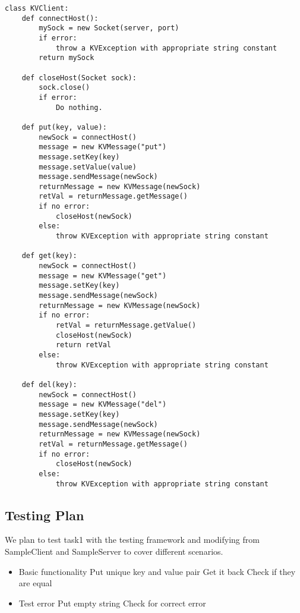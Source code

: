 \begin{verbatim}
class KVClient:
    def connectHost():
        mySock = new Socket(server, port)
        if error:
            throw a KVException with appropriate string constant
        return mySock

    def closeHost(Socket sock):
        sock.close()
        if error:
            Do nothing.

    def put(key, value):
        newSock = connectHost()
        message = new KVMessage("put")
        message.setKey(key)
        message.setValue(value)
        message.sendMessage(newSock)
        returnMessage = new KVMessage(newSock)
        retVal = returnMessage.getMessage()
        if no error:
            closeHost(newSock)
        else:
            throw KVException with appropriate string constant

    def get(key):
        newSock = connectHost()
        message = new KVMessage("get")
        message.setKey(key)
        message.sendMessage(newSock)
        returnMessage = new KVMessage(newSock)
        if no error:
            retVal = returnMessage.getValue()
            closeHost(newSock)
            return retVal
        else:
            throw KVException with appropriate string constant

    def del(key):
        newSock = connectHost()
        message = new KVMessage("del")
        message.setKey(key)
        message.sendMessage(newSock)
        returnMessage = new KVMessage(newSock)
        retVal = returnMessage.getMessage()
        if no error:
            closeHost(newSock)
        else:
            throw KVException with appropriate string constant

\end{verbatim}

\subsection{Testing Plan}
We plan to test task1 with the testing framework and modifying from SampleClient and SampleServer to cover different scenarios.
\begin{itemize}
\item Basic functionality
\subitem Put unique key and value pair
\subitem Get it back
\subitem Check if they are equal
\item Test error
\subitem Put empty string
\subitem Check for correct error
\end{itemize}